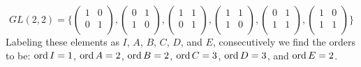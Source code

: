 \begin{example}
    \begin{equation*}
        GL(2,2)=\{
            \begin{pmatrix}
                1   &   0   \\
                0   &   1   \\
            \end{pmatrix},
            \begin{pmatrix}
                0   &   1   \\
                1   &   0   \\
            \end{pmatrix},
            \begin{pmatrix}
                1   &   1   \\
                0   &   1   \\
            \end{pmatrix},
            \begin{pmatrix}
                1   &   1   \\
                1   &   0   \\
            \end{pmatrix},
            \begin{pmatrix}
                0   &   1   \\
                1   &   1   \\
            \end{pmatrix},
            \begin{pmatrix}
                1   &   0   \\
                1   &   1   \\
            \end{pmatrix}
        \}
    \end{equation*}
    Labeling these elements as $I$,  $A$,  $B$,  $C$,  $D$, and  $E$,
    consecutively we find the orders to be:  $\operatorname{ord}{I}=1$, $\operatorname{ord}{A}=2$,
    $\operatorname{ord}{B}=2$, $\operatorname{ord}{C}=3$, $\operatorname{ord}{D}=3$, and $\operatorname{ord}{E}=2$.
\end{example}

